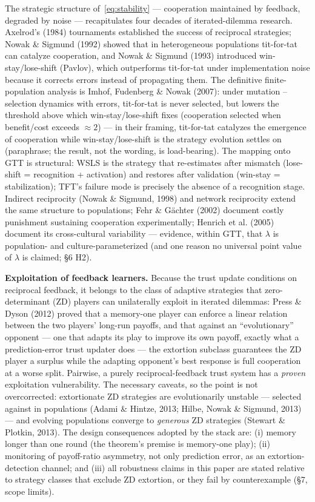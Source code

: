 \documentclass[11pt,twocolumn]{article}
\theoremstyle{gttdef}
\theoremstyle{gttplain}
\begin{document}
The strategic structure of~\eqref{eq:stability} --- cooperation maintained by feedback, degraded by noise --- recapitulates four decades of iterated-dilemma research. Axelrod's (1984) tournaments established the success of reciprocal strategies; Nowak \& Sigmund (1992) showed that in heterogeneous populations tit-for-tat can catalyze cooperation, and Nowak \& Sigmund (1993) introduced win-stay/lose-shift (Pavlov), which outperforms tit-for-tat under implementation noise because it corrects errors instead of propagating them. The definitive finite-population analysis is Imhof, Fudenberg \& Nowak (2007): under mutation -- selection dynamics with errors, tit-for-tat is never selected, but lowers the threshold above which win-stay/lose-shift fixes (cooperation selected when benefit/cost exceeds $\approx 2$) --- in their framing, tit-for-tat catalyzes the emergence of cooperation while win-stay/lose-shift is the strategy evolution settles on (paraphrase; the result, not the wording, is load-bearing). The mapping onto GTT is structural: WSLS is the strategy that re-estimates after mismatch (lose-shift = recognition + activation) and restores after validation (win-stay = stabilization); TFT's failure mode is precisely the absence of a recognition stage. Indirect reciprocity (Nowak \& Sigmund, 1998) and network reciprocity extend the same structure to populations; Fehr \& Gächter (2002) document costly punishment sustaining cooperation experimentally; Henrich et al. (2005) document its cross-cultural variability --- evidence, within GTT, that $\lambda$ is population- and culture-parameterized (and one reason no universal point value of $\lambda$ is claimed; \S{}6 H2).

\textbf{Exploitation of feedback learners.} Because the trust update conditions on reciprocal feedback, it belongs to the class of adaptive strategies that zero-determinant (ZD) players can unilaterally exploit in iterated dilemmas: Press \& Dyson (2012) proved that a memory-one player can enforce a linear relation between the two players' long-run payoffs, and that against an ``evolutionary'' opponent --- one that adapts its play to improve its own payoff, exactly what a prediction-error trust updater does --- the extortion subclass guarantees the ZD player a surplus while the adapting opponent's best response is full cooperation at a worse split. Pairwise, a purely reciprocal-feedback trust system has a \emph{proven} exploitation vulnerability. The necessary caveats, so the point is not overcorrected: extortionate ZD strategies are evolutionarily unstable --- selected against in populations (Adami \& Hintze, 2013; Hilbe, Nowak \& Sigmund, 2013) --- and evolving populations converge to \emph{generous} ZD strategies (Stewart \& Plotkin, 2013). The design consequences adopted by the stack are: (i) memory longer than one round (the theorem's premise is memory-one play); (ii) monitoring of payoff-ratio asymmetry, not only prediction error, as an extortion-detection channel; and (iii) all robustness claims in this paper are stated relative to strategy classes that exclude ZD extortion, or they fail by counterexample (\S{}7, scope limits).
\end{document}
